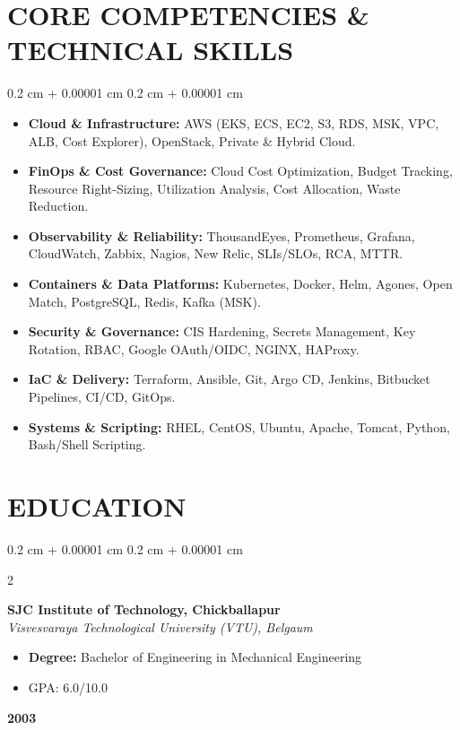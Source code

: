 \documentclass[10pt, letterpaper]{article}
\newenvironment{highlights}{
    \begin{itemize}[
        topsep=0.10 cm,
        parsep=0.10 cm,
        partopsep=0pt,
        itemsep=0pt,
        leftmargin=0.4 cm + 10pt
    ]
}{
    \end{itemize}
} %
\newenvironment{highlightsforbulletentries}{
    \begin{itemize}[
        topsep=0.10 cm,
        parsep=0.10 cm,
        partopsep=0pt,
        itemsep=0pt,
        leftmargin=10pt
    ]
}{
    \end{itemize}
} %
\newenvironment{onecolentry}{
    \begin{adjustwidth}{
        0.2 cm + 0.00001 cm
    }{
        0.2 cm + 0.00001 cm
    }
}{
    \end{adjustwidth}
} %
\newenvironment{twocolentry}[2][]{
    \onecolentry
    \def\secondColumn{#2}
    \setcolumnwidth{\fill, 4.5 cm}
    \begin{paracol}{2}
}{
    \switchcolumn \raggedleft \secondColumn
    \end{paracol}
    \endonecolentry
} %
\begin{document}
        \vspace{0.2 cm}

    \section{CORE COMPETENCIES \& TECHNICAL SKILLS}

    \begin{onecolentry}
        \begin{highlightsforbulletentries}
        \item \textbf{Cloud \& Infrastructure:} AWS (EKS, ECS, EC2, S3, RDS, MSK, VPC, ALB, Cost Explorer), OpenStack, Private \& Hybrid Cloud.
        \item \textbf{FinOps \& Cost Governance:} Cloud Cost Optimization, Budget Tracking, Resource Right-Sizing, Utilization Analysis, Cost Allocation, Waste Reduction.
        \item \textbf{Observability \& Reliability:} ThousandEyes, Prometheus, Grafana, CloudWatch, Zabbix, Nagios, New Relic, SLIs/SLOs, RCA, MTTR.
        \item \textbf{Containers \& Data Platforms:} Kubernetes, Docker, Helm, Agones, Open Match, PostgreSQL, Redis, Kafka (MSK).
        \item \textbf{Security \& Governance:} CIS Hardening, Secrets Management, Key Rotation, RBAC, Google OAuth/OIDC, NGINX, HAProxy.
        \item \textbf{IaC \& Delivery:} Terraform, Ansible, Git, Argo CD, Jenkins, Bitbucket Pipelines, CI/CD, GitOps.
        \item \textbf{Systems \& Scripting:} RHEL, CentOS, Ubuntu, Apache, Tomcat, Python, Bash/Shell Scripting.    
        \end{highlightsforbulletentries}
    \end{onecolentry}

    \section{EDUCATION}
        \begin{twocolentry}{
        \textbf{2003}
        }
        \textbf{SJC Institute of Technology, Chickballapur} \\
        \textit{Visvesvaraya Technological University (VTU), Belgaum}
        \begin{highlights}
            \item \textbf{Degree:} Bachelor of Engineering in Mechanical Engineering
            \item GPA: 6.0/10.0
        \end{highlights}
        \end{twocolentry}
\end{document}
